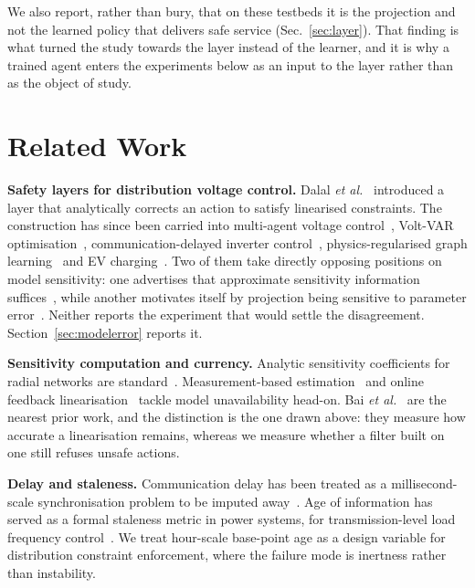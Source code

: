 \documentclass[conference,a4paper]{IEEEtran}
\begin{document}
We also report, rather than bury, that on these testbeds it is the projection and
not the learned policy that delivers safe service (Sec.~\ref{sec:layer}). That
finding is what turned the study towards the layer instead of the learner, and it
is why a trained agent enters the experiments below as an input to the layer
rather than as the object of study.

\section{Related Work}

\textbf{Safety layers for distribution voltage control.} Dalal \emph{et
al.}~\cite{dalal2018} introduced a layer that analytically corrects an action to
satisfy linearised constraints. The construction has since been carried into
multi-agent voltage control~\cite{aamas2023}, Volt-VAR
optimisation~\cite{kou2022}, communication-delayed inverter
control~\cite{gan2023}, physics-regularised graph learning~\cite{bigat2026} and
EV charging~\cite{evsafe2024}. Two of them take directly opposing positions on
model sensitivity: one advertises that approximate sensitivity information
suffices~\cite{aamas2023}, while another motivates itself by projection being
sensitive to parameter error~\cite{bigat2026}. Neither reports the experiment
that would settle the disagreement. Section~\ref{sec:modelerror} reports it.

\textbf{Sensitivity computation and currency.} Analytic sensitivity coefficients
for radial networks are standard~\cite{christakou2013}. Measurement-based
estimation~\cite{modelless} and online feedback linearisation~\cite{bai2022}
tackle model unavailability head-on. Bai \emph{et al.}~\cite{bai2022} are the
nearest prior work, and the distinction is the one drawn above: they measure how
accurate a linearisation remains, whereas we measure whether a filter built on one still
refuses unsafe actions.

\textbf{Delay and staleness.} Communication delay has been treated as a
millisecond-scale synchronisation problem to be imputed away~\cite{gan2023}. Age
of information has served as a formal staleness metric in power systems, for
transmission-level load frequency control~\cite{aoi_lfc}. We treat hour-scale
base-point age as a design variable for distribution constraint enforcement,
where the failure mode is inertness rather than instability.
\end{document}
